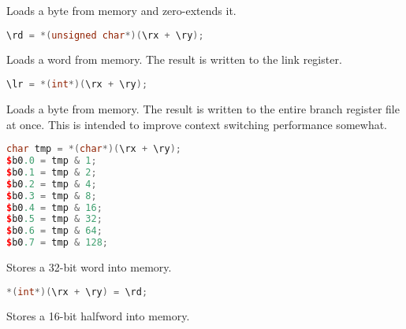 Loads a byte from memory and zero-extends it.

\begin{lstlisting}[numbers=none, basicstyle=\ttfamily\footnotesize, language=C++]
\rd = *(unsigned char*)(\rx + \ry);
\end{lstlisting}

Loads a word from memory. The result is written to the link register.

\begin{lstlisting}[numbers=none, basicstyle=\ttfamily\footnotesize, language=C++]
\lr = *(int*)(\rx + \ry);
\end{lstlisting}

Loads a byte from memory. The result is written to the entire branch register
file at once. This is intended to improve context switching performance
somewhat.

\begin{lstlisting}[numbers=none, basicstyle=\ttfamily\footnotesize, language=C++]
char tmp = *(char*)(\rx + \ry);
$b0.0 = tmp & 1;
$b0.1 = tmp & 2;
$b0.2 = tmp & 4;
$b0.3 = tmp & 8;
$b0.4 = tmp & 16;
$b0.5 = tmp & 32;
$b0.6 = tmp & 64;
$b0.7 = tmp & 128;
\end{lstlisting}

Stores a 32-bit word into memory.

\begin{lstlisting}[numbers=none, basicstyle=\ttfamily\footnotesize, language=C++]
*(int*)(\rx + \ry) = \rd;
\end{lstlisting}

Stores a 16-bit halfword into memory.

